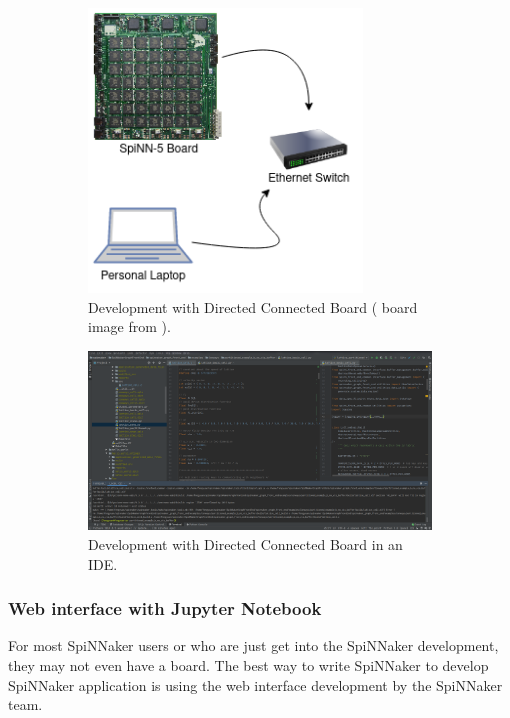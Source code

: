 \begin{figure}
\centering
\begin{subfigure}[tb]{1\textwidth}
   \centering
       \includegraphics[width=0.8\textwidth]{figures/laptop.png}
       \caption{Development with Directed Connected Board ( board image from \cite{spinn-core}).}
       \label{fig:laptop}
\end{subfigure}

\begin{subfigure}[tb]{1\textwidth}
   \centering
       \includegraphics[width=1\textwidth]{figures/ide.png}
       \caption{Development with Directed Connected Board in an IDE.}
       \label{fig:ide}
\end{subfigure}

\caption[]{}
\end{figure}


\subsubsection{Web interface with Jupyter Notebook}
For most SpiNNaker users or who are just get into the SpiNNaker development, they may not even have a board. The best way to write SpiNNaker to develop SpiNNaker application is using the web interface development by the SpiNNaker team. \\

